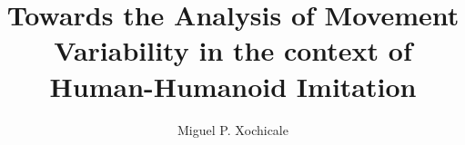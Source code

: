 \title{Towards the Analysis of Movement Variability in the context of Human-Humanoid Imitation}



\author{Miguel P. Xochicale}










